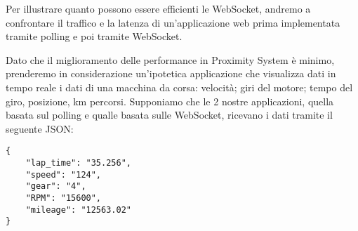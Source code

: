 Per illustrare quanto possono essere efficienti le WebSocket,
andremo a confrontare il traffico e la latenza di un'applicazione web prima implementata tramite polling e poi tramite WebSocket.

Dato che il miglioramento delle performance in Proximity System è minimo, 
prenderemo in considerazione un'ipotetica applicazione che visualizza dati in tempo reale i dati di una macchina da corsa: velocità; giri del motore; tempo del giro, posizione, km percorsi.
Supponiamo che le 2 nostre applicazioni, quella basata sul polling e qualle basata sulle WebSocket, ricevano i dati tramite il seguente JSON:
\begin{lstlisting}[caption={JSON dati macchina}, style=javaScriptCode]
{
	"lap_time": "35.256", 
	"speed": "124",
	"gear": "4",
	"RPM": "15600",
	"mileage": "12563.02"
}
\end{lstlisting} 

